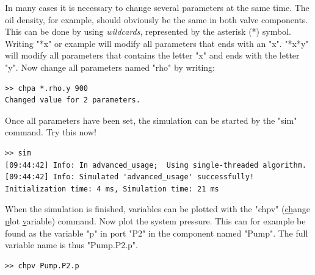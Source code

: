 \documentclass[a4paper,pdftex]{article}
\begin{document}
\begin{enumerate}
In many cases it is necessary to change several parameters at the same time. The oil density, for example, should obviously be the same in both valve components. This can be done by using \textit{wildcards}, represented by the asterisk (*) symbol. Writing "*x" or example will modify all parameters that ends with an "x". "*x*y" will modify all parameters that contains the letter "x" and ends with the letter "y". Now change all parameters named "rho" by writing:

\vspace{5pt}\hspace{10pt}
\begin{minipage}{0.5\linewidth}
\begin{verbatim}
>> chpa *.rho.y 900
Changed value for 2 parameters.
\end{verbatim}
\end{minipage}
\vspace{5pt}

Once all parameters have been set, the simulation can be started by the "sim" command. Try this now!

\vspace{5pt}\hspace{10pt}
\begin{minipage}{0.5\linewidth}
\begin{verbatim}
>> sim
[09:44:42] Info: In advanced_usage;  Using single-threaded algorithm.
[09:44:42] Info: Simulated 'advanced_usage' successfully! Initialization time: 4 ms, Simulation time: 21 ms
\end{verbatim}
\end{minipage}
\vspace{5pt}

When the simulation is finished, variables can be plotted with the "chpv" (\underline{ch}ange \underline{p}lot \underline{v}ariable) command. Now plot the system pressure. This can for example be found as the variable "p" in port "P2" in the component named "Pump". The full variable name is thus "Pump.P2.p".

\vspace{5pt}\hspace{10pt}
\begin{minipage}{0.5\linewidth}
\begin{verbatim}
>> chpv Pump.P2.p
\end{verbatim}
\end{minipage}
\vspace{5pt}


\end{enumerate}
\end{document}
